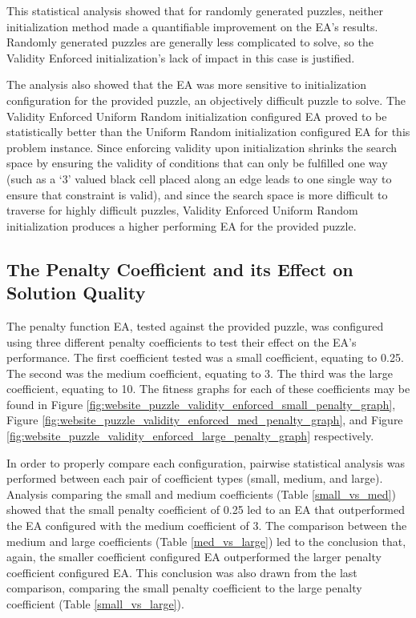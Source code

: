 \documentclass[11pt]{article}
\begin{document}
This statistical analysis showed that for randomly generated puzzles, neither initialization method
made a quantifiable improvement on the EA's results. Randomly generated puzzles are generally less
complicated to solve, so the Validity Enforced initialization's lack of impact in this case is justified.

The analysis also showed that the EA was more sensitive to initialization configuration
for the provided puzzle, an objectively difficult puzzle to solve. The Validity Enforced Uniform Random
initialization configured EA proved to be statistically better than the Uniform Random initialization
configured EA for this problem instance. Since enforcing validity upon initialization shrinks the search space by ensuring the validity
of conditions that can only be fulfilled one way (such as a `3' valued black cell placed along an edge leads to one single way to
ensure that constraint is valid), and since the search space is more difficult to traverse for 
highly difficult puzzles, Validity Enforced Uniform Random initialization produces a higher performing EA for 
the provided puzzle.


\subsection{The Penalty Coefficient and its Effect on Solution Quality}

The penalty function EA, tested against the provided puzzle, was configured using three different penalty coefficients
to test their effect on the EA's performance. The first coefficient tested was a small coefficient, equating to 0.25. The
second was the medium coefficient, equating to 3. The third was the large coefficient, equating to 10. The fitness graphs for
each of these coefficients may be found in Figure \ref{fig:website_puzzle_validity_enforced_small_penalty_graph},
Figure \ref{fig:website_puzzle_validity_enforced_med_penalty_graph}, and Figure 
\ref{fig:website_puzzle_validity_enforced_large_penalty_graph} respectively.

In order to properly compare each configuration, pairwise statistical analysis was performed between each pair of coefficient types
(small, medium, and large). Analysis comparing the small and medium coefficients (Table \ref{small_vs_med}) showed that the small
penalty coefficient of 0.25 led to an EA that outperformed the EA configured with the medium coefficient of 3. The comparison between
the medium and large coefficients (Table \ref{med_vs_large}) led to the conclusion that, again, the smaller coefficient configured EA 
outperformed the larger penalty coefficient configured EA. This conclusion was also drawn from the last comparison, comparing the small
penalty coefficient to the large penalty coefficient (Table \ref{small_vs_large}).
\end{document}
